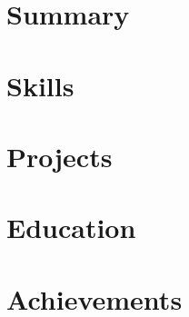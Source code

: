 \documentclass[a4paper,10pt]{article}
\begin{document}
\section{Summary}


\section{Skills}


% 

\section{Projects}


\section{Education}



% 
\section{Achievements}

\end{document}
